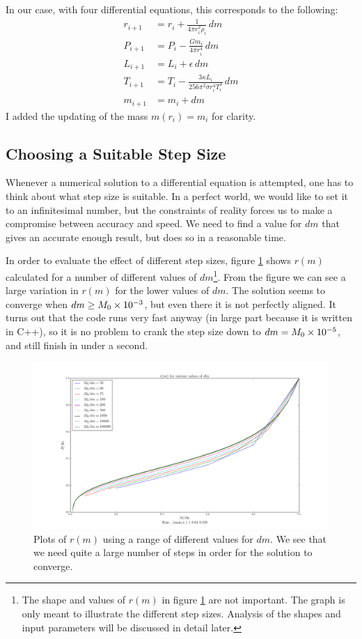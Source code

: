 \documentclass[11pt,twocolumn]{article}
\begin{document}
In our case, with four differential equations, this corresponds to the
following:
\begin{align*}
  r_{i+1} &= r_i +  \frac{ 1 }{ 4\pi r_i^2\rho_i }\,dm\\
  P_{i+1} &= P_{i} - \frac{ Gm_i }{ 4\pi r^4_i }\,dm\\
  L_{i+1} &= L_i + \epsilon\,dm\\
  T_{i+1} &= T_i - \frac{ 3\kappa L_i }{ 256 \pi^2 \sigma r_i^4T_i^3
            }\,dm\\
  m_{i+1} &= m_i + dm
\end{align*}
I added the updating of the mass $m(r_i)=m_i$ for clarity.


\subsection{Choosing a Suitable Step Size}
Whenever a numerical solution to a differential equation is attempted,
one has to think about what step size is suitable. In a perfect
world, we would like to set it to an infinitesimal number, but the
constraints of reality forces us to make a compromise between accuracy
and speed. We need to find a value for $dm$ that gives an accurate
enough result, but does so in a reasonable time. 

In order to evaluate the effect of different step sizes, figure
\ref{fig:dm-variation-no-dss} shows $r(m)$ calculated for a number of
different values of $dm$\footnote{The shape and values of $r(m)$ in
  figure \ref{fig:dm-variation-no-dss} are not important. The graph is
  only meant to illustrate the different step sizes. Analysis of the
  shapes and input parameters will be discussed in detail
  later.}. From the figure we can see a large variation in $r(m)$ for
the lower values of $dm$. The solution seems to converge when
$dm \geq M_0\times 10^{-3}$, but even there it is not perfectly aligned. It
turns out that the code runs very fast anyway (in large part because
it is written in C++), so it is no problem to crank the step size down
to $dm= M_0\times 10^{-5}$, and still finish in under a second.

\begin{figure}[ht]
  \centering
  \includegraphics[width=\linewidth]{fig/dm_variation_no_dss.png}
  \caption{\label{fig:dm-variation-no-dss} Plots of $r(m)$ using a
    range of different values for $dm$. We see that we need quite a
    large number of steps in order for the solution to converge.}
\end{figure}
\end{document}

